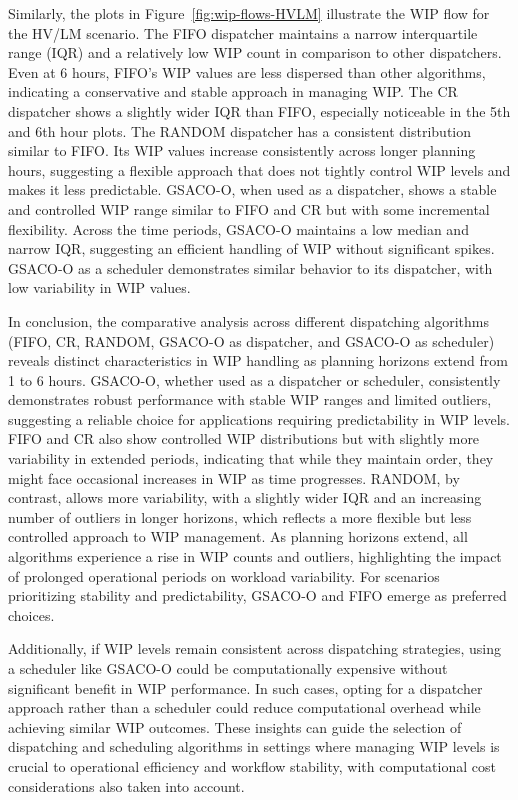 Similarly, the plots in Figure~\ref{fig:wip-flows-HVLM} illustrate the WIP flow for the HV/LM scenario. The FIFO dispatcher maintains a narrow interquartile range (IQR) and a relatively low WIP count in comparison to other dispatchers.
Even at 6 hours, FIFO’s WIP values are less dispersed than other algorithms, indicating a conservative and stable approach in managing WIP.
The CR dispatcher shows a slightly wider IQR than FIFO, especially noticeable in the 5th and 6th hour plots.
The RANDOM dispatcher has a consistent distribution similar to FIFO. Its WIP values increase consistently across longer planning hours, suggesting a flexible approach that does not tightly control WIP levels and makes it less predictable.
GSACO-O, when used as a dispatcher, shows a stable and controlled WIP range similar to FIFO and CR but with some incremental flexibility.
Across the time periods, GSACO-O maintains a low median and narrow IQR, suggesting an efficient handling of WIP without significant spikes. GSACO-O as a scheduler demonstrates similar behavior to its dispatcher, with low variability in WIP values.

In conclusion, the comparative analysis across different dispatching algorithms (FIFO, CR, RANDOM, GSACO-O as dispatcher, and GSACO-O as scheduler) reveals distinct characteristics in WIP handling as planning horizons extend from 1 to 6 hours.
GSACO-O, whether used as a dispatcher or scheduler, consistently demonstrates robust performance with stable WIP ranges and limited outliers, suggesting a reliable choice for applications requiring predictability in WIP levels. FIFO and CR also show controlled WIP distributions but with slightly more variability in extended periods, indicating that while they maintain order, they might face occasional increases in WIP as time progresses. RANDOM, by contrast, allows more variability, with a slightly wider IQR and an increasing number of outliers in longer horizons, which reflects a more flexible but less controlled approach to WIP management.
As planning horizons extend, all algorithms experience a rise in WIP counts and outliers, highlighting the impact of prolonged operational periods on workload variability. For scenarios prioritizing stability and predictability, GSACO-O and FIFO emerge as preferred choices.

Additionally, if WIP levels remain consistent across dispatching strategies, using a scheduler like GSACO-O could be computationally expensive without significant benefit in WIP performance. In such cases, opting for a dispatcher approach rather than a scheduler could reduce computational overhead while achieving similar WIP outcomes. These insights can guide the selection of dispatching and scheduling algorithms in settings where managing WIP levels is crucial to operational efficiency and workflow stability, with computational cost considerations also taken into account.
















